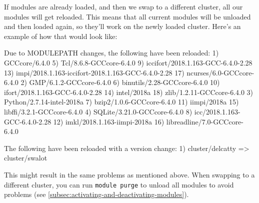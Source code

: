 If modules are already loaded, and then we swap to a different cluster,
all our modules will get reloaded. This means that all current modules will be
unloaded and then loaded again, so they'll work on the newly loaded cluster.
Here's an example of how that would look like:

\begin{prompt}

Due to MODULEPATH changes, the following have been reloaded:
  1) GCCcore/6.4.0                   5) Tcl/8.6.8-GCCcore-6.4.0           9) iccifort/2018.1.163-GCC-6.4.0-2.28    13) impi/2018.1.163-iccifort-2018.1.163-GCC-6.4.0-2.28    17) ncurses/6.0-GCCcore-6.4.0
  2) GMP/6.1.2-GCCcore-6.4.0         6) binutils/2.28-GCCcore-6.4.0      10) ifort/2018.1.163-GCC-6.4.0-2.28       14) intel/2018a                                           18) zlib/1.2.11-GCCcore-6.4.0
  3) Python/2.7.14-intel-2018a       7) bzip2/1.0.6-GCCcore-6.4.0        11) iimpi/2018a                           15) libffi/3.2.1-GCCcore-6.4.0
  4) SQLite/3.21.0-GCCcore-6.4.0     8) icc/2018.1.163-GCC-6.4.0-2.28    12) imkl/2018.1.163-iimpi-2018a           16) libreadline/7.0-GCCcore-6.4.0

The following have been reloaded with a version change:
  1) cluster/delcatty => cluster/swalot
\end{prompt}

This might result in the same problems as mentioned above. When swapping to a
different cluster, you can run \verb|module purge| to unload all modules to avoid problems
(see \autoref{subsec:activating-and-deactivating-modules}).

\fi
